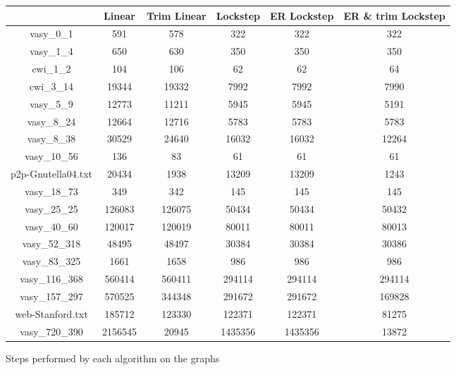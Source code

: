 \documentclass[../master/master.tex]{subfiles}
\begin{document}
\begin{figure}
\begin{tabular}{ |c||c||c||c||c||c|| } 
\hline
  & Linear & Trim Linear & Lockstep & ER Lockstep & ER \& trim Lockstep \\
\hline
 vasy\_0\_1 & 591 & 578 & 322 & 322 & 322 \\
\hline
 vasy\_1\_4 & 650 & 630 & 350 & 350 & 350 \\
\hline
 cwi\_1\_2 & 104 & 106 & 62 & 62 & 64 \\
\hline
 cwi\_3\_14 & 19344 & 19332 & 7992 & 7992 & 7990 \\
\hline
 vasy\_5\_9 & 12773 & 11211 & 5945 & 5945 & 5191 \\
\hline
 vasy\_8\_24 & 12664 & 12716 & 5783 & 5783 & 5783 \\
\hline
 vasy\_8\_38 & 30529 & 24640 & 16032 & 16032 & 12264 \\
\hline
 vasy\_10\_56 & 136 & 83 & 61 & 61 & 61 \\
\hline
 p2p-Gnutella04.txt & 20434 & 1938 & 13209 & 13209 & 1243 \\
\hline
 vasy\_18\_73 & 349 & 342 & 145 & 145 & 145 \\
\hline
 vasy\_25\_25 & 126083 & 126075 & 50434 & 50434 & 50432 \\
\hline
 vasy\_40\_60 & 120017 & 120019 & 80011 & 80011 & 80013 \\
\hline
 vasy\_52\_318 & 48495 & 48497 & 30384 & 30384 & 30386 \\
\hline
 vasy\_83\_325 & 1661 & 1658 & 986 & 986 & 986 \\
\hline
 vasy\_116\_368 & 560414 & 560411 & 294114 & 294114 & 294114 \\
\hline
 vasy\_157\_297 & 570525 & 344348 & 291672 & 291672 & 169828 \\
\hline
 web-Stanford.txt & 185712 & 123330 & 122371 & 122371 & 81275 \\
\hline
 vasy\_720\_390 & 2156545 & 20945 & 1435356 & 1435356 & 13872 \\
\hline
\end{tabular}
\caption{Steps performed by each algorithm on the graphs} \label{stepres}
\end{figure}
\end{document}
